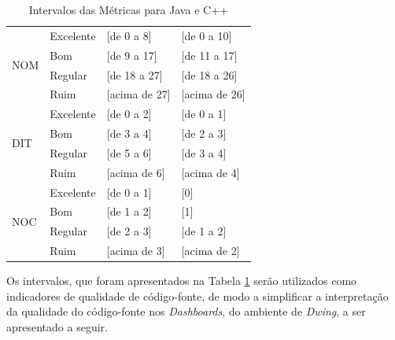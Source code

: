 \begin{table}[!ht]
\begin{center}
\begin{tabular}{ |l|l|l|l| }
		\multirow{4}{*}{NOM} 
		 & Excelente & [de 0 a 8] & [de 0 a 10] \\
		 & Bom & [de 9 a 17] & [de 11 a 17] \\
		 & Regular & [de 18 a 27] & [de 18 a 26] \\
		 & Ruim & [acima de 27] & [acima de 26] \\ \hline
		 
		\multirow{4}{*}{DIT} 
		 & Excelente & [de 0 a 2] & [de 0 a 1] \\
		 & Bom & [de 3 a 4] & [de 2 a 3] \\
		 & Regular & [de 5 a 6] & [de 3 a 4] \\
		 & Ruim & [acima de 6] & [acima de 4] \\ \hline
		
		\multirow{4}{*}{NOC} 
		 & Excelente & [de 0 a 1] & [0] \\
		 & Bom & [de 1 a 2] & [1] \\
		 & Regular & [de 2 a 3] & [de 1 a 2] \\
		 & Ruim & [acima de 3] & [acima de 2] \\ \hline
		 
	\end{tabular}
	\caption{Intervalos das Métricas para Java e C++}
	\label{metrics}
	\end{center}
	\end{table}
\FloatBarrier
	
Os intervalos, que foram apresentados na Tabela \ref{metrics} serão utilizados
como indicadores de qualidade de código-fonte, de modo a simplificar a 
interpretação da qualidade do código-fonte nos \textit{Dashboards}, do ambiente de \textit{Dwing}, a ser apresentado a seguir.